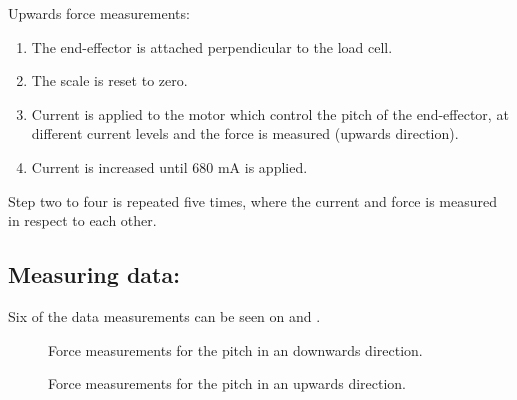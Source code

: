 Upwards force measurements:
\begin{enumerate}
\item The end-effector is attached perpendicular to the load cell. 
\item The scale is reset to zero.
\item Current is applied to the motor which control the pitch of the end-effector, at different current levels and the force is measured (upwards direction).
\item Current is increased until 680 mA is applied.
\end{enumerate}
Step two to four is repeated five times, where the current and force is measured in respect to each other. 

\subsection*{Measuring data:}
Six of the data measurements can be seen on  and .

\begin{figure}[H]
\centering

\caption{Force measurements for the pitch in an downwards direction.}
\label{fig:pitch_down}
\end{figure}

\begin{figure}[H]
\centering

\caption{Force measurements for the pitch in an upwards direction.}
\label{fig:pitch_up}
\end{figure}





